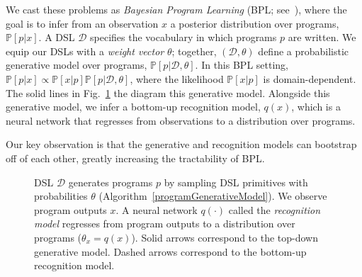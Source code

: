 \documentclass{article}
\newcommand{\probability}{\mathds{P}} %
\begin{document}
We cast these problems as \emph{Bayesian Program
  Learning} (BPL; see~\citep{lake2013one,ellis2016sampling,DBLP:conf/icml/LiangJK10}),
where the goal is to infer from an observation $x$ a posterior distribution over programs, $\probability[p|x]$.
A DSL $\mathcal{D}$ specifies the vocabulary in which programs $p$ are written.
We equip our DSLs with a \emph{weight vector} $\theta$; together, $(\mathcal{D},\theta)$
define a probabilistic generative model over programs, $\probability[p|\mathcal{D},\theta]$.
In this BPL setting, $\probability[p|x]\propto \probability[x|p]\probability[p|\mathcal{D},\theta]$,
where the likelihood $\probability[x|p]$ is domain-dependent.
The solid lines in Fig.~\ref{graphicalModel} the diagram this generative model.
Alongside this generative model,
we infer a bottom-up recognition model, $q(x)$, which is a neural network that regresses from observations to a distribution over programs.

Our key observation is that the generative and recognition models can bootstrap off of each other,
greatly increasing the tractability of BPL.


\begin{figure}
  \caption{DSL $\mathcal{D}$ generates programs $p$ by sampling DSL primitives with probabilities $\theta$ (Algorithm~\ref{programGenerativeModel}). We observe program outputs $x$. A neural network $q(\cdot )$ called the \emph{recognition model} regresses from program outputs to a distribution over programs ($\theta_x = q(x)$). Solid arrows correspond to the top-down generative model. Dashed arrows correspond to the bottom-up recognition model.}\label{graphicalModel}
\end{figure}
\end{document}
